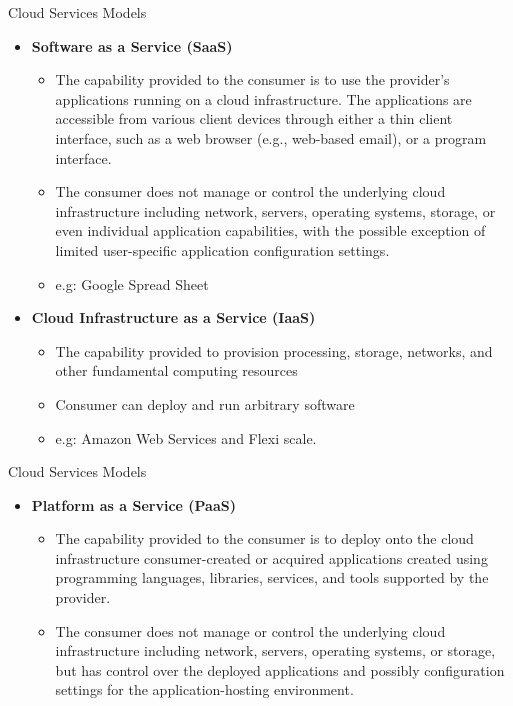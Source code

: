 \documentclass{SKP-beamer}
\begin{document}
\begin{frame}{Cloud Services Models}
	\begin{itemize}
		
		\item  \textbf{Software as a Service (SaaS)}
		\begin{itemize}
			
			\item The capability provided to the consumer is to use the provider’s applications running on a cloud infrastructure. The applications 
			are accessible from various client devices through either a thin client interface, such as a web browser (e.g., web-based email), or 
			a program interface.
			
			\item The consumer does not manage or control the underlying cloud infrastructure including network, servers, operating systems, 
			storage, or even individual application capabilities, with the possible exception of limited user-specific application configuration 
			settings.
			
			\item e.g: Google Spread Sheet
			
		\end{itemize}
		\item \textbf{Cloud Infrastructure as a Service (IaaS)}
		\begin{itemize}
			
			\item The capability provided to provision processing, storage, networks, and other fundamental computing resources
			\item Consumer can deploy and run arbitrary software
			\item e.g: Amazon Web Services and Flexi scale.
		\end{itemize}
	\end{itemize}
\end{frame}


\begin{frame}{Cloud Services Models}
	\begin{itemize}
		
		\item  \textbf{Platform as a Service (PaaS)}
		\begin{itemize}
			
			\item The capability provided to the consumer is to deploy onto the cloud infrastructure consumer-created or 
			acquired applications created using programming languages, libraries, services, and tools supported by the 
			provider.
			
			\item The consumer does not manage or control the underlying cloud infrastructure including network, servers, 
			operating systems, or storage, but has control over the deployed applications and possibly configuration 
			settings for the application-hosting environment.
			
		\end{itemize}
	\end{itemize}
\end{frame}
\end{document}
